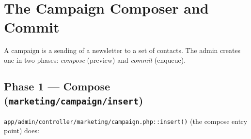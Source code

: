 \documentclass[11pt,a4paper]{article}
\begin{document}
\section{The Campaign Composer and Commit}\label{sec:campaigns}

A campaign is a sending of a newsletter to a set of contacts. The
admin creates one in two phases: \emph{compose} (preview) and
\emph{commit} (enqueue).

\subsection{Phase 1 --- Compose (\texttt{marketing/campaign/insert})}

\texttt{app/admin/controller/marketing/campaign.php::insert()} (the
compose entry point) does:
\end{document}

